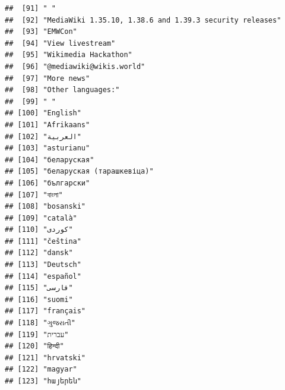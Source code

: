 \documentclass[
]{article}
\begin{document}
\begin{verbatim}
##  [91] " "                                                                  
##  [92] "MediaWiki 1.35.10, 1.38.6 and 1.39.3 security releases"             
##  [93] "EMWCon"                                                             
##  [94] "View livestream"                                                    
##  [95] "Wikimedia Hackathon"                                                
##  [96] "@mediawiki@wikis.world"                                             
##  [97] "More news"                                                          
##  [98] "Other languages:"                                                   
##  [99] " "                                                                  
## [100] "English"                                                            
## [101] "Afrikaans"                                                          
## [102] "العربية"                                                            
## [103] "asturianu"                                                          
## [104] "беларуская"                                                         
## [105] "беларуская (тарашкевіца)"                                           
## [106] "български"                                                          
## [107] "বাংলা"                                                              
## [108] "bosanski"                                                           
## [109] "català"                                                             
## [110] "کوردی"                                                              
## [111] "čeština"                                                            
## [112] "dansk"                                                              
## [113] "Deutsch"                                                            
## [114] "español"                                                            
## [115] "فارسی"                                                              
## [116] "suomi"                                                              
## [117] "français"                                                           
## [118] "ગુજરાતી"                                                             
## [119] "עברית"                                                              
## [120] "हिन्दी"                                                              
## [121] "hrvatski"                                                           
## [122] "magyar"                                                             
## [123] "հայերեն"                                                            

\end{verbatim}
\end{document}
